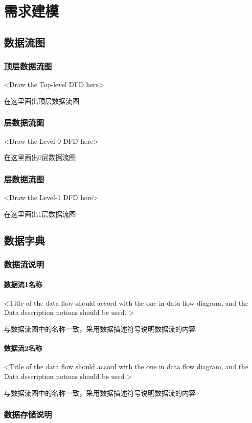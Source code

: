 \chapter{需求建模 }
\section{数据流图}
\subsection{顶层数据流图}
<Draw the Top-level DFD here>

在这里画出顶层数据流图

\subsection{层数据流图}
<Draw the Level-0 DFD here>

在这里画出0层数据流图

\subsection{层数据流图}
<Draw the Level-1 DFD here>

在这里画出1层数据流图

\section{数据字典}
\subsection{数据流说明}
\subsubsection{数据流1名称}
<Title of  the data flow should accord with the one in data flow diagram, and the Data description notions should be used.  >

与数据流图中的名称一致，采用数据描述符号说明数据流的内容

\subsubsection{数据流2名称}
<Title of  the data flow should accord with the one in data flow diagram, and the Data description notions should be used   >

与数据流图中的名称一致，采用数据描述符号说明数据流的内容

\subsection{数据存储说明}
